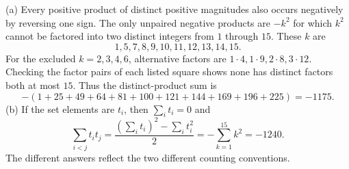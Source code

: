 (a) Every positive product of distinct positive magnitudes also occurs negatively by reversing one sign. The only unpaired negative products are $-k^2$ for which $k^2$ cannot be factored into two distinct integers from $1$ through $15$. These $k$ are
\[1,5,7,8,9,10,11,12,13,14,15.\]
For the excluded $k=2,3,4,6$, alternative factors are $1\cdot4,1\cdot9,2\cdot8,3\cdot12$. Checking the factor pairs of each listed square shows none has distinct factors both at most $15$. Thus the distinct-product sum is
\[-(1+25+49+64+81+100+121+144+169+196+225)=\boxed{-1175}.\]
(b) If the set elements are $t_i$, then $\sum_i t_i=0$ and
\[\sum_{i<j}t_it_j=\dfrac{(\sum_i t_i)^2-\sum_i t_i^2}{2}=-\sum_{k=1}^{15}k^2=\boxed{-1240}.\]
The different answers reflect the two different counting conventions.
